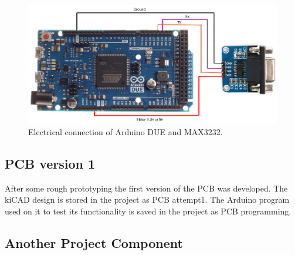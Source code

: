 \begin{figure}[H]
          \centering
          \includegraphics[width=1\linewidth]{img/MAX3232_connection.png}
          \caption{Electrical connection of Arduino DUE and MAX3232.}
          \label{MAX3232_Arduino}
    \end{figure}


\subsection{PCB version 1}
After some rough prototyping the first version of the PCB was developed. The kiCAD design is stored in the project as PCB attempt1. The Arduino program used on it to test its functionality is saved in the project as PCB programming.

\subsection{Another Project Component}
\lipsum[1]